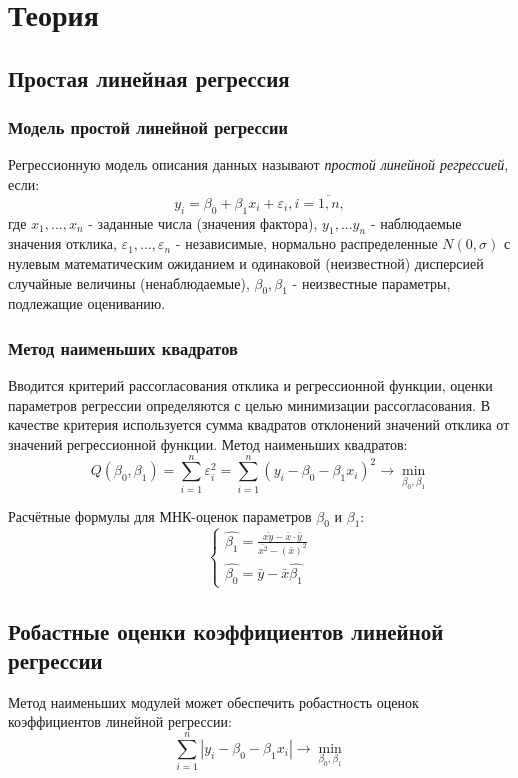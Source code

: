 \documentclass[12pt,a4paper]{article}
\begin{document}
\section{Теория}
\subsection{Простая линейная регрессия}
\subsubsection{Модель простой линейной регрессии}
Регрессионную модель описания данных называют \textit{простой линейной регрессией}, если:
\begin{equation}
    y_i=\beta_0+\beta_1x_i+\varepsilon_i,i=\overline{1,n},
\end{equation}
где $x_1,...,x_n$ - заданные числа (значения фактора), $y_1,...y_n$ - наблюдаемые значения отклика, $\varepsilon_1,...,\varepsilon_n$ -  независимые, нормально распределенные $N(0,\sigma)$ с нулевым математическим ожиданием и одинаковой (неизвестной) дисперсией случайные величины (ненаблюдаемые),	$\beta_0,\beta_1$ - неизвестные параметры, подлежащие оцениванию.

\subsubsection{Метод наименьших квадратов}
Вводится критерий рассогласования отклика и регрессионной функции, оценки параметров регрессии определяются с целью минимизации рассогласования. В качестве критерия используется сумма квадратов отклонений значений отклика от значений регрессионной функции.
Метод наименьших квадратов:
\begin{equation}
    Q(\beta_0,\beta_1)=\sum_{i=1}^n{\varepsilon_i^2}=\sum_{i=1}^n{(y_i-\beta_0-\beta_1x_i)^2}\rightarrow\min_{\beta_0,\beta_1}
\end{equation}

Расчётные формулы для МНК-оценок параметров $\beta_0$ и $\beta_1$:
\begin{equation}
    \left\{
    \begin{array}{ll}
        \hat{\beta_1}=\frac{\bar{xy}-\bar{x}\cdot\bar{y}}{\bar{x^2}-(\bar{x})^2}\\
        \hat{\beta_0}=\bar{y}-\bar{x}\hat{\beta_1}
    \end{array}
    \right.
\end{equation}

\subsection{Робастные оценки коэффициентов линейной регрессии}
Метод наименьших модулей может обеспечить робастность оценок коэффициентов линейной регрессии:
\begin{equation}
    \sum_{i=1}^n{|y_i-\beta_0-\beta_1x_i|}\rightarrow\min_{\beta_0,\beta_1}
\end{equation}
\end{document}
